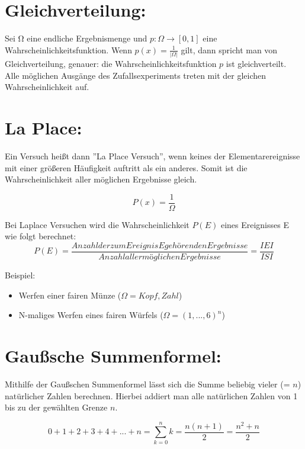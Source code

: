 \documentclass[11pt]{article}
\begin{document}
    \section{Gleichverteilung:}

    Sei Ω eine endliche Ergebnismenge und \(p : \Omega \rightarrow [0, 1]\) eine Wahrscheinlichkeitsfunktion.
    Wenn \( p(x) = \frac{1}{|\Omega|}\) gilt, dann spricht man von Gleichverteilung,
    genauer: die Wahrscheinlichkeitsfunktion \(p\) ist gleichverteilt.
    Alle möglichen Ausgänge des Zufallsexperiments treten mit der gleichen Wahrscheinlichkeit auf.


    \section{La Place:}

    Ein Versuch heißt dann ”La Place Versuch”, wenn keines der Elementarereignisse mit einer größeren
    Häufigkeit auftritt als ein anderes. Somit ist die Wahrscheinlichkeit aller möglichen Ergebnisse gleich.

    \[P(x)= \frac{1}{\Omega}\]

    Bei Laplace Versuchen wird die Wahrscheinlichkeit \(P(E)\) eines Ereignisses E wie folgt berechnet:
    \[P(E)= \frac{Anzahl der zum Ereignis E gehörenden Ergebnisse} {Anzahl aller möglichen Ergebnisse} = \frac{IEI} {ISI}\]


    Beispiel:
    \begin{itemize}
        \item Werfen einer fairen Münze (\(\Omega= {Kopf, Zahl}\))
    \end{itemize}
    \begin{itemize}
        \item N-maliges Werfen eines fairen Würfels (\(\Omega=({1,...,6}) ^n\))
    \end{itemize}


    \section{Gaußsche Summenformel: }

    Mithilfe der Gaußschen Summenformel lässt sich die Summe beliebig vieler (= \(n\)) natürlicher Zahlen berechnen.
    Hierbei addiert man alle natürlichen Zahlen von 1 bis zu der gewählten Grenze \(n\).

    \[0 + 1 +2 +3+ 4+ ...+n = \sum \limits_{k=0}^{n} k = \frac{n(n+1)}{2} = \frac {n^{2}+n}{2}\]
\end{document}
